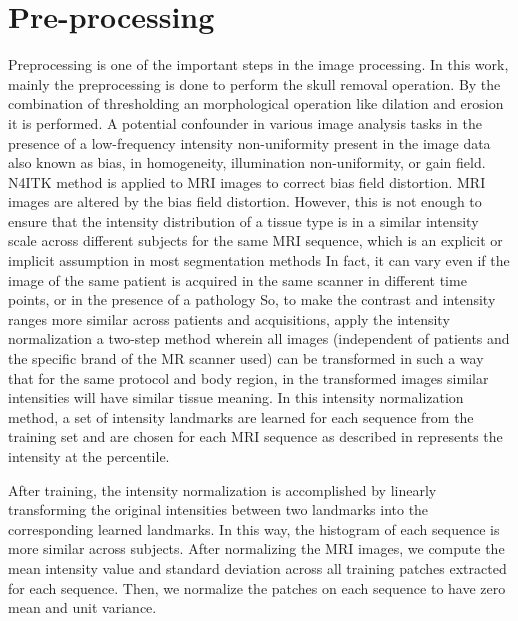 
\section{Pre-processing}
Preprocessing is one of the important steps in the image processing. In this work, mainly the preprocessing is done to perform the skull removal operation. By the combination of thresholding an morphological operation like dilation and erosion it is performed. A potential confounder in various image analysis tasks in the presence of a low-frequency intensity non-uniformity present in the image data also known as bias, in homogeneity, illumination non-uniformity, or gain field. 
N4ITK method is applied to MRI images to correct bias field distortion. MRI images are altered by the bias field distortion. However, this is not enough to ensure that the intensity distribution of a tissue type is in a similar intensity scale across different subjects for the same MRI sequence, which is an explicit or implicit assumption in most segmentation methods In fact, it can vary even if the image of the same patient is acquired in the same scanner in different time points, or in the presence of a pathology So, to make the contrast and intensity ranges more similar across patients and acquisitions, apply the intensity normalization a two-step method wherein all images (independent of patients and the specific brand of the MR scanner used) can be transformed in such a way that for the same protocol and body region, in the transformed images similar intensities will have similar tissue meaning.
In this intensity normalization method, a set of intensity landmarks are learned for each sequence from the training set and are chosen for each MRI sequence as described in represents the intensity at the percentile.

After training, the intensity normalization is accomplished by linearly transforming the original intensities between two landmarks into the corresponding learned landmarks. In this way, the histogram of each sequence is more similar across subjects. After normalizing the MRI images, we compute the mean intensity value and standard deviation across all training patches extracted for each sequence. Then, we normalize the patches on each sequence to have zero mean and unit variance.


